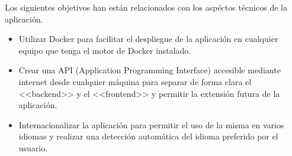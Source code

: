 Los siguientes objetivos han están relacionados con los aspéctos técnicos de la
aplicación.

\begin{itemize}
    \item Utilizar Docker para facilitar el despliegue de la
    aplicación en cualquier equipo que tenga el motor de Docker instalado.
    \item Crear una API (Application Programming Interface) accesible mediante
    internet desde cualquier máquina para separar de forma clara el <<backend>>
    y el <<frontend>> y permitir la extensión futura de la aplicación.
    \item Internacionalizar la aplicación para permitir el uso de la misma en
    varios idiomas y realizar una detección automática del idioma preferido por
    el usuario.
\end{itemize}